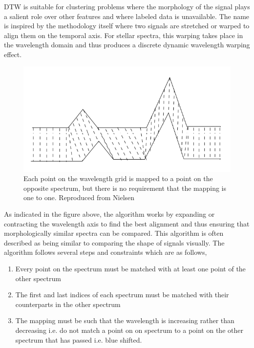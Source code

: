 DTW is suitable for clustering problems where the morphology of the signal plays a salient role over other features \cite{nielsen2019practical} and where labeled data is unavailable. The name is inspired by the methodology itself where two signals are stretched or warped to align them on the temporal axis. For stellar spectra, this warping takes place in the wavelength domain and thus produces a discrete dynamic wavelength warping effect.

\begin{figure}[!htb]
\centering
\includegraphics[scale=0.90]{figures/Dynamic_time_warping.png}
\caption{Each point on the wavelength grid is mapped to a point on the opposite spectrum, but there is no requirement that the mapping is one to one. Reproduced from Nielsen \cite{nielsen2019practical}}
\end{figure}

As indicated in the figure above, the algorithm works by expanding or contracting the wavelength axis to find the best alignment and thus ensuring that morphologically similar spectra can be compared. This algorithm is often described as being similar to comparing the shape of signals visually. The algorithm follows several steps and constraints which are as follows,

\begin{enumerate}
    \item Every point on the spectrum must be matched with at least one point of the other spectrum
    \item The first and last indices of each spectrum must be matched with their counterparts in the other spectrum
    \item The mapping must be such that the wavelength is increasing rather than decreasing i.e. do not match a point on on spectrum to a point on the other spectrum that has passed i.e. blue shifted. 
\end{enumerate}

